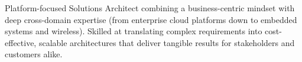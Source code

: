 \begin{cvparagraph}

Platform-focused Solutions Architect combining a business-centric mindset with deep cross-domain expertise (from
enterprise cloud platforms down to embedded systems and wireless). Skilled at translating complex requirements into
cost-effective, scalable architectures that deliver tangible results for stakeholders and customers alike.

\end{cvparagraph}
